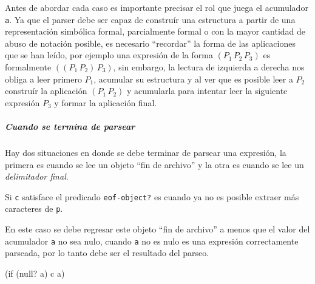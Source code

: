 \documentclass[10pt,oneside,openany,letterpaper]{book}
\begin{document}
Antes de abordar cada caso es importante precisar el rol que juega el acumulador {\tt{}a}. Ya que el parser debe ser capaz de construír una estructura a partir de una representación simbólica formal, parcialmente formal o con la mayor cantidad de abuso de notación posible, es necesario ``recordar'' la forma de las aplicaciones que se han leído, por ejemplo una expresión de la forma \( (P_{1}\, P_{2}\, P_{3}) \) es formalmente \( ((P_{1}\, P_{2})\, P_{3}) \), sin embargo, la lectura de izquierda a derecha nos obliga a leer primero \( P_{1} \), acumular su estructura y al ver que es posible leer a \( P_{2} \) construír la aplicación \( (P_{1}\, P_{2}) \) y acumularla para intentar leer la siguiente expresión \( P_{3} \) y formar la aplicación final.

\subparagraph{Cuando se termina de parsear} Hay dos situaciones en donde se debe terminar de parsear una expresión, la primera es cuando se lee un objeto ``fin de archivo'' y la otra es cuando se lee un \emph{delimitador final}.

Si {\tt{}c} satisface el predicado {\tt{}eof-object?} es cuando ya no es posible extraer más caracteres de {\tt{}p}.

\nwenddocs{}
\nwendcode{}\nwdocspar

En este caso se debe regresar este objeto ``fin de archivo'' a menos que el valor del acumulador {\tt{}a} no sea nulo, cuando {\tt{}a} no es nulo es una expresión correctamente parseada, por lo tanto debe ser el resultado del parseo.

\nwenddocs{}\endmoddef
(if (null? a) c a)
\nwendcode{}\nwdocspar
\end{document}
